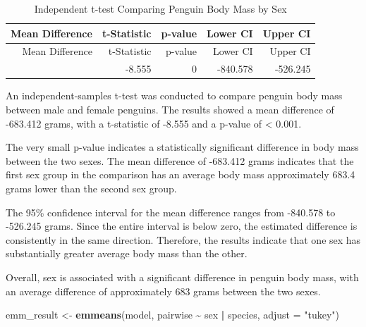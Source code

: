 \documentclass[
  11pt,
]{article}
\newenvironment{Shaded}{\begin{snugshade}}{\end{snugshade}}
\newcommand{\AttributeTok}[1]{\textcolor[rgb]{0.13,0.29,0.53}{#1}}
\newcommand{\FunctionTok}[1]{\textcolor[rgb]{0.13,0.29,0.53}{\textbf{#1}}}
\newcommand{\NormalTok}[1]{#1}
\newcommand{\OtherTok}[1]{\textcolor[rgb]{0.56,0.35,0.01}{#1}}
\newcommand{\SpecialCharTok}[1]{\textcolor[rgb]{0.81,0.36,0.00}{\textbf{#1}}}
\newcommand{\StringTok}[1]{\textcolor[rgb]{0.31,0.60,0.02}{#1}}
\begin{document}
\begin{longtable}[]{@{}rrrrr@{}}
\caption{Independent t-test Comparing Penguin Body Mass by
Sex}\tabularnewline
\toprule\noalign{}
Mean Difference & t-Statistic & p-value & Lower CI & Upper CI \\
\midrule\noalign{}
\endfirsthead
\toprule\noalign{}
Mean Difference & t-Statistic & p-value & Lower CI & Upper CI \\
\midrule\noalign{}
\endhead
\bottomrule\noalign{}
\endlastfoot
-683.412 & -8.555 & 0 & -840.578 & -526.245 \\
\end{longtable}

An independent-samples t-test was conducted to compare penguin body mass
between male and female penguins. The results showed a mean difference
of -683.412 grams, with a t-statistic of -8.555 and a p-value of
\textless{} 0.001.

The very small p-value indicates a statistically significant difference
in body mass between the two sexes. The mean difference of -683.412
grams indicates that the first sex group in the comparison has an
average body mass approximately 683.4 grams lower than the second sex
group.

The 95\% confidence interval for the mean difference ranges from
-840.578 to -526.245 grams. Since the entire interval is below zero, the
estimated difference is consistently in the same direction. Therefore,
the results indicate that one sex has substantially greater average body
mass than the other.

Overall, sex is associated with a significant difference in penguin body
mass, with an average difference of approximately 683 grams between the
two sexes.

\begin{Shaded}
\begin{Highlighting}[]
\NormalTok{emm\_result }\OtherTok{\textless{}{-}} \FunctionTok{emmeans}\NormalTok{(model, pairwise }\SpecialCharTok{\textasciitilde{}}\NormalTok{ sex }\SpecialCharTok{|}\NormalTok{ species, }\AttributeTok{adjust =} \StringTok{"tukey"}\NormalTok{)}
\end{Highlighting}
\end{Shaded}
\end{document}
